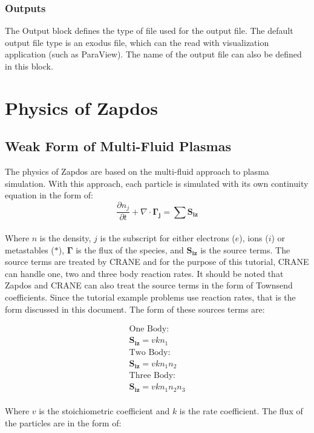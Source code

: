 \documentclass[final]{report}
\begin{document}
  \subsection{Outputs}
  The Output block defines the type of file used for the output file. The default output file type is an exodus file, which can the read with visualization application (such as ParaView). The name of the output file can also be defined in this block.


  \chapter{Physics of Zapdos} \label{chapter3}
  \section{Weak Form of Multi-Fluid Plasmas}
  The physics of Zapdos are based on the multi-fluid approach to plasma simulation. With this approach, each particle is simulated with its own continuity equation in the form of:
  \begin{equation}
      \frac{\partial n_{j}}{\partial t}+\nabla\cdot\mathbf{\Gamma_{j}}=\sum{\mathbf{S_{iz}}}
  \end{equation}
  \\
  Where $n$ is the density, $j$ is the subscript for either electrons ($e$), ions ($i$) or metastables ($*$), $\mathbf{\Gamma}$ is the flux of the species, and $\mathbf{S_{iz}}$ is the source terms. The source terms are treated by CRANE and for the purpose of this tutorial, CRANE can handle one, two and three body reaction rates. It should be noted that Zapdos and CRANE can also treat the source terms in the form of Townsend coefficients. Since the tutorial example problems use reaction rates, that is the form discussed in this document. The form of these sources terms are:

  \begin{equation}
    \begin{gathered}
    \text{One Body:} \\
    \mathbf{S_{iz}}=vkn_{1} \\
    \text{Two Body:} \\
    \mathbf{S_{iz}}=vkn_{1}n_{2} \\
    \text{Three Body:} \\
    \mathbf{S_{iz}}=vkn_{1}n_{2}n_{3}
    \end{gathered}
  \end{equation}
  \\
  Where $v$ is the stoichiometric coefficient and $k$ is the rate coefficient. The flux of the particles are in the form of:
\end{document}
